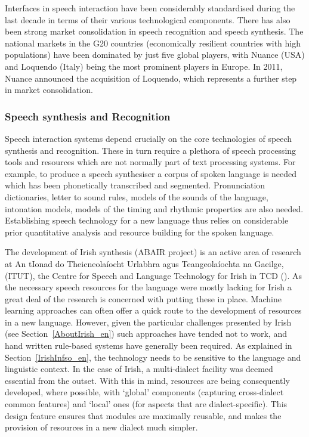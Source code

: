 \begin{multicols}{2}
Interfaces in speech interaction have been considerably standardised during the last decade in terms of their various technological components. There has also been strong market consolidation in speech recognition and speech synthesis. The national markets in the G20 countries (economically resilient countries with high populations) have been dominated by just five global players, with Nuance (USA) and Loquendo (Italy) being the most prominent players in Europe. In 2011, Nuance announced the acquisition of Loquendo, which represents a further step in market consolidation.

\subsubsection*{Speech synthesis and Recognition}

Speech interaction systems depend crucially on the core technologies of speech synthesis and recognition. These in turn require a plethora of speech processing tools and resources which are not normally part of text processing systems. For example, to produce a speech synthesiser a corpus of spoken language is needed which has been phonetically transcribed and segmented. Pronunciation dictionaries, letter to sound rules, models of the sounds of the language, intonation models, models of the timing and rhythmic properties are also needed. Establishing speech technology for a new language thus relies on considerable prior quantitative analysis and resource building for the spoken language.

The development of Irish synthesis (ABAIR project) is an active area of research at An tIonad do Theicneolaíocht Urlabhra agus Teangeolaíochta na Gaeilge, (ITUT), the Centre for Speech and Language Technology for Irish in TCD (\cite{pittsburgh}).  As the necessary speech resources for the language were mostly lacking for Irish a great deal of the research is concerned with putting these in place. Machine learning approaches can often offer a quick route to the development of resources in a new language. However, given the particular challenges presented by Irish (see Section~\ref{AboutIrish_en}) such approaches have tended not to work, and hand written rule-based systems have generally been required. As explained in Section~\ref{IrishInfso_en}, the technology needs to be sensitive to the language and linguistic context. In the case of Irish, a multi-dialect facility was deemed essential from the outset. With this in mind, resources are being consequently developed, where possible, with `global’ components (capturing cross-dialect common features) and `local' ones (for aspects that are dialect-specific). This design feature ensures that modules are maximally reusable, and makes the provision of resources in a new dialect much simpler.


\end{multicols}
